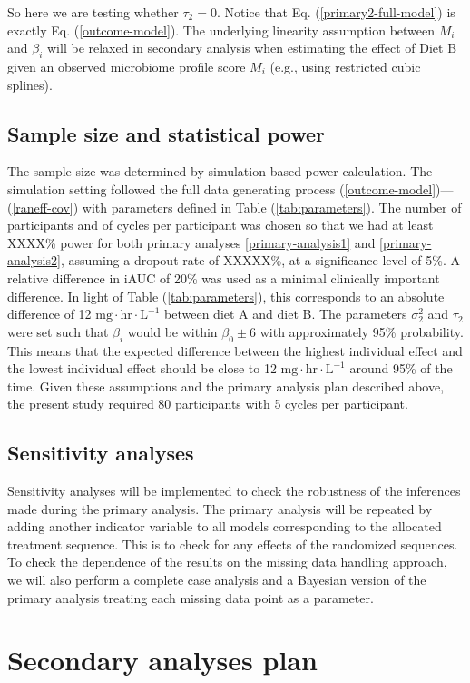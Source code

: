 \documentclass[12pt]{article}
\begin{document}
So here we are testing whether $\tau_2 = 0$. Notice that Eq. (\ref{primary2-full-model}) is exactly Eq. (\ref{outcome-model}). The underlying linearity assumption between $M_i$ and $\beta_i$ will be relaxed in secondary analysis when estimating the effect of Diet B given an observed microbiome profile score $M_i$ (e.g., using restricted cubic splines).
\newpage
\subsection{Sample size and statistical power}
The sample size was determined by simulation-based power calculation. The simulation setting followed the full data generating process (\ref{outcome-model})---(\ref{raneff-cov}) with parameters defined in Table (\ref{tab:parameters}). The number of participants and of cycles per participant was chosen so that we had at least XXXX\% power for both primary analyses \ref{primary-analysis1} and \ref{primary-analysis2}, assuming a dropout rate of XXXXX\%, at a significance level of 5\%. A relative difference in iAUC of 20\% was used as a minimal clinically important difference. In light of Table (\ref{tab:parameters}), this corresponds to an absolute difference of 12$\textrm{ mg}\cdot \textrm{hr}\cdot \textrm{L}^{-1}$ between diet A and diet B. The parameters $\sigma^2_2$ and $\tau_2$ were set such that $\beta_i$ would be within $\beta_0 \pm 6$ with approximately 95\% probability. This means that the expected difference between the highest individual effect and the lowest individual effect should be close to 12$\textrm{ mg}\cdot \textrm{hr}\cdot \textrm{L}^{-1}$ around 95\% of the time. Given these assumptions and the primary analysis plan described above, the present study required 80 participants with 5 cycles per participant.
\subsection{Sensitivity analyses}
Sensitivity analyses will be implemented to check the robustness of the inferences made during the primary analysis. The primary analysis will be repeated by adding another indicator variable to all models corresponding to the allocated treatment sequence. This is to check for any effects of the randomized sequences. To check the dependence of the results on the missing data handling approach, we will also perform a complete case analysis and a Bayesian version of the primary analysis treating each missing data point as a parameter.
\newpage
\section{Secondary analyses plan}
\end{document}
